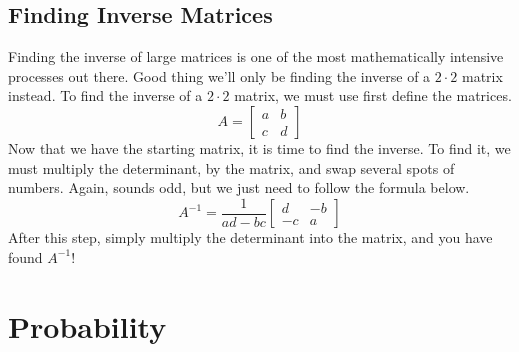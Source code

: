 \documentclass[final,1p,12pt]{elsarticle}
\begin{document}
    \subsection{Finding Inverse Matrices}
        Finding the inverse of large matrices is one of the most mathematically intensive processes out there.
        Good thing we'll only be finding the inverse of a $2\cdot2$ matrix instead. To find the inverse of a $2\cdot 2$ matrix, we must use first define the matrices.
        \begin{equation*}
        A = 
            \begin{bmatrix}
                a & b\\
                c & d
            \end{bmatrix}
        \end{equation*}
        Now that we have the starting matrix, it is time to find the inverse. To find it, we must multiply the determinant, by the matrix, and swap several spots of numbers. Again, sounds odd, but we just need to follow the formula below.
        \begin{equation*}
        A^{-1} = \frac{1}{ad-bc}
            \begin{bmatrix}
                d & -b\\
                -c & a
            \end{bmatrix}
        \end{equation*}
        After this step, simply multiply the determinant into the matrix, and you have found $A^{-1}$!

\section{Probability}
\end{document}
